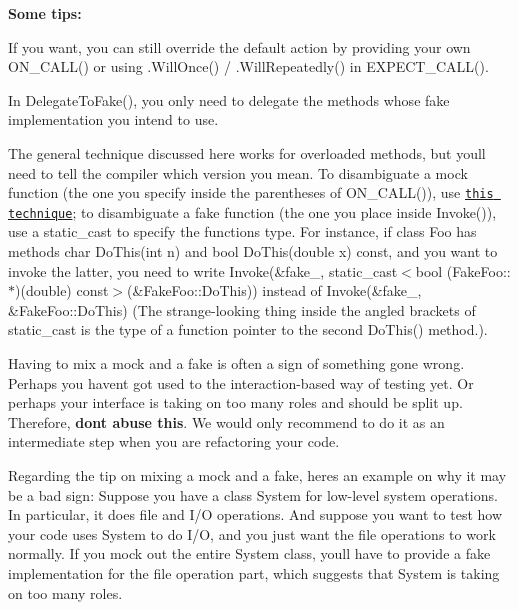 {\bfseries Some tips\+:}


\begin{DoxyItemize}
\item If you want, you can still override the default action by providing your own {\ttfamily O\+N\+\_\+\+C\+A\+L\+L()} or using {\ttfamily .Will\+Once()} / {\ttfamily .Will\+Repeatedly()} in {\ttfamily E\+X\+P\+E\+C\+T\+\_\+\+C\+A\+L\+L()}.
\item In {\ttfamily Delegate\+To\+Fake()}, you only need to delegate the methods whose fake implementation you intend to use.
\item The general technique discussed here works for overloaded methods, but you\textquotesingle{}ll need to tell the compiler which version you mean. To disambiguate a mock function (the one you specify inside the parentheses of {\ttfamily O\+N\+\_\+\+C\+A\+L\+L()}), use \href{#SelectOverload}{\tt this technique}; to disambiguate a fake function (the one you place inside {\ttfamily Invoke()}), use a {\ttfamily static\+\_\+cast} to specify the function\textquotesingle{}s type. For instance, if class {\ttfamily Foo} has methods {\ttfamily char Do\+This(int n)} and {\ttfamily bool Do\+This(double x) const}, and you want to invoke the latter, you need to write {\ttfamily Invoke(\&fake\+\_\+, static\+\_\+cast$<$bool (Fake\+Foo\+:\+:$\ast$)(double) const$>$(\&Fake\+Foo\+::\+Do\+This))} instead of {\ttfamily Invoke(\&fake\+\_\+, \&\+Fake\+Foo\+::\+Do\+This)} (The strange-\/looking thing inside the angled brackets of {\ttfamily static\+\_\+cast} is the type of a function pointer to the second {\ttfamily Do\+This()} method.).
\item Having to mix a mock and a fake is often a sign of something gone wrong. Perhaps you haven\textquotesingle{}t got used to the interaction-\/based way of testing yet. Or perhaps your interface is taking on too many roles and should be split up. Therefore, {\bfseries don\textquotesingle{}t abuse this}. We would only recommend to do it as an intermediate step when you are refactoring your code.
\end{DoxyItemize}

Regarding the tip on mixing a mock and a fake, here\textquotesingle{}s an example on why it may be a bad sign\+: Suppose you have a class {\ttfamily System} for low-\/level system operations. In particular, it does file and I/O operations. And suppose you want to test how your code uses {\ttfamily System} to do I/O, and you just want the file operations to work normally. If you mock out the entire {\ttfamily System} class, you\textquotesingle{}ll have to provide a fake implementation for the file operation part, which suggests that {\ttfamily System} is taking on too many roles.

